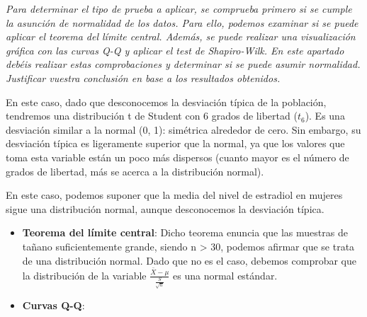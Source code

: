 \documentclass[
]{article}
\newenvironment{Shaded}{\begin{snugshade}}{\end{snugshade}}
\newcommand{\DataTypeTok}[1]{\textcolor[rgb]{0.13,0.29,0.53}{#1}}
\newcommand{\KeywordTok}[1]{\textcolor[rgb]{0.13,0.29,0.53}{\textbf{#1}}}
\newcommand{\NormalTok}[1]{#1}
\newcommand{\OperatorTok}[1]{\textcolor[rgb]{0.81,0.36,0.00}{\textbf{#1}}}
\newcommand{\StringTok}[1]{\textcolor[rgb]{0.31,0.60,0.02}{#1}}
\begin{document}
\emph{Para determinar el tipo de prueba a aplicar, se comprueba primero
si se cumple la asunción de normalidad de los datos. Para ello, podemos
examinar si se puede aplicar el teorema del límite central. Además, se
puede realizar una visualización gráfica con las curvas Q-Q y aplicar el
test de Shapiro-Wilk. En este apartado debéis realizar estas
comprobaciones y determinar si se puede asumir normalidad. Justificar
vuestra conclusión en base a los resultados obtenidos. }

\begin{Shaded}
\end{Shaded}

En este caso, dado que desconocemos la desviación típica de la
población, tendremos una distribución t de Student con 6 grados de
libertad (\(t_{6}\)). Es una desviación similar a la normal (0, 1):
simétrica alrededor de cero. Sin embargo, su desviación típica es
ligeramente superior que la normal, ya que los valores que toma esta
variable están un poco más dispersos (cuanto mayor es el número de
grados de libertad, más se acerca a la distribución normal).

En este caso, podemos suponer que la media del nivel de estradiol en
mujeres sigue una distribución normal, aunque desconocemos la desviación
típica.

\begin{itemize}
\item
  \textbf{Teorema del límite central}: Dicho teorema enuncia que las
  muestras de tañano suficientemente grande, siendo n \textgreater{} 30,
  podemos afirmar que se trata de una distribución normal. Dado que no
  es el caso, debemos comprobar que la distribución de la variable
  \(\frac{\bar{X} - \mu}{\frac{S}{\sqrt{n}}}\) es una normal estándar.
\item
  \textbf{Curvas Q-Q}:
\end{itemize}

\begin{Shaded}
\end{Shaded}
\end{document}
